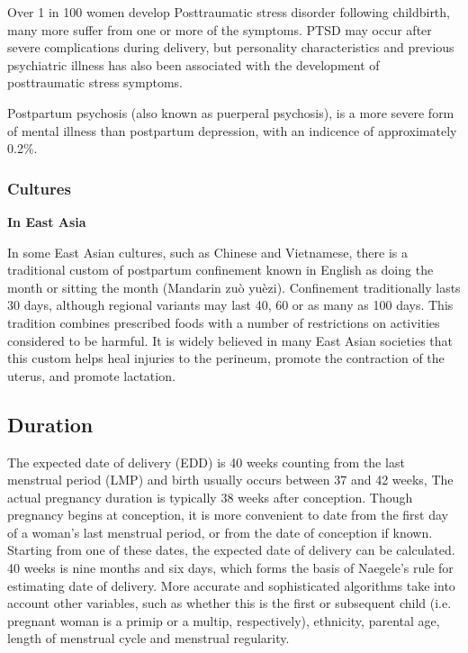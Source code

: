 \documentclass[12pt,a4paper,onecolumn]{article}
\begin{document}
Over 1 in 100 women develop Posttraumatic stress disorder following childbirth, many more suffer
from one or more of the symptoms. PTSD may occur after severe complications during delivery, but
personality characteristics and previous psychiatric illness has also been associated with the
development of posttraumatic stress symptoms.

Postpartum psychosis (also known as puerperal psychosis), is a more severe form of mental illness
than postpartum depression, with an indicence of approximately 0.2\%.

\subsubsection{Cultures}

\textbf{In East Asia}

In some East Asian cultures, such as Chinese and Vietnamese, there is a traditional custom of
postpartum confinement known in English as doing the month or sitting the month (Mandarin zuò
yuèzi). Confinement traditionally lasts 30 days, although regional variants may last 40, 60 or as
many as 100 days. This tradition combines prescribed foods with a number of restrictions on
activities considered to be harmful. It is widely believed in many East Asian societies that this
custom helps heal injuries to the perineum, promote the contraction of the uterus, and promote
lactation.

\subsection{Duration}

The expected date of delivery (EDD) is 40 weeks counting from the last menstrual period (LMP) and
birth usually occurs between 37 and 42 weeks, The actual pregnancy duration is typically 38 weeks
after conception. Though pregnancy begins at conception, it is more convenient to date from the
first day of a woman's last menstrual period, or from the date of conception if known. Starting from
one of these dates, the expected date of delivery can be calculated. 40 weeks is nine months and six
days, which forms the basis of Naegele's rule for estimating date of delivery. More accurate and
sophisticated algorithms take into account other variables, such as whether this is the first or
subsequent child (i.e. pregnant woman is a primip or a multip, respectively), ethnicity, parental
age, length of menstrual cycle and menstrual regularity.
\end{document}

